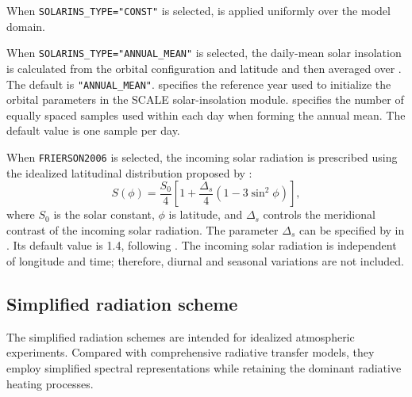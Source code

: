 When \verb|SOLARINS_TYPE="CONST"| is selected,  is applied uniformly over the model domain.

When \verb|SOLARINS_TYPE="ANNUAL_MEAN"| is selected, the daily-mean solar insolation is calculated from the orbital configuration and latitude and then averaged over .
The default is \verb|"ANNUAL_MEAN"|.
 specifies the reference year used to initialize the orbital parameters in the SCALE solar-insolation module.
 specifies the number of equally spaced samples used within each day when forming the annual mean.
The default value is one sample per day.


When \verb|FRIERSON2006| is selected, 
the incoming solar radiation is prescribed using the idealized latitudinal distribution proposed by \cite{Frierson2006}:
%
\begin{equation}
S(\phi) = \frac{S_0}{4} \left[1+ \frac{\Delta_s}{4}\left(1 - 3\sin^2\phi\right)\right],
\label{eq:solarins_frierson2006}
\end{equation}
%
where $S_0$ is the solar constant, $\phi$ is latitude, and 
$\Delta_s$ controls the meridional contrast of the incoming solar radiation.
The parameter $\Delta_s$ can be specified by  in .
Its default value is 1.4, following \cite{Frierson2006}.
The incoming solar radiation is independent of longitude and time; therefore, diurnal and seasonal variations are not included.


\subsection{Simplified radiation scheme}
\label{subsec:physics_rd_simple}

The simplified radiation schemes are intended for idealized atmospheric experiments.
Compared with comprehensive radiative transfer models, they employ simplified spectral representations 
while retaining the dominant radiative heating processes.

